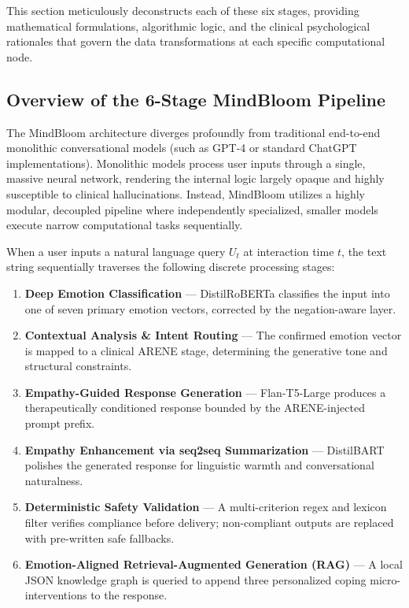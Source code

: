 \documentclass[12pt,twoside]{article}
\begin{document}
This section meticulously deconstructs each of these six stages, providing mathematical formulations, algorithmic logic, and the clinical psychological rationales that govern the data transformations at each specific computational node.

\subsection{Overview of the 6-Stage MindBloom Pipeline}

The MindBloom architecture diverges profoundly from traditional end-to-end monolithic conversational models (such as GPT-4 or standard ChatGPT implementations). Monolithic models process user inputs through a single, massive neural network, rendering the internal logic largely opaque and highly susceptible to clinical hallucinations. Instead, MindBloom utilizes a highly modular, decoupled pipeline where independently specialized, smaller models execute narrow computational tasks sequentially.

When a user inputs a natural language query $U_t$ at interaction time $t$, the text string sequentially traverses the following discrete processing stages:
\begin{enumerate}[leftmargin=2em]
  \item \textbf{Deep Emotion Classification} --- DistilRoBERTa classifies the input into one of seven primary emotion vectors, corrected by the negation-aware layer.
  \item \textbf{Contextual Analysis \& Intent Routing} --- The confirmed emotion vector is mapped to a clinical ARENE stage, determining the generative tone and structural constraints.
  \item \textbf{Empathy-Guided Response Generation} --- Flan-T5-Large produces a therapeutically conditioned response bounded by the ARENE-injected prompt prefix.
  \item \textbf{Empathy Enhancement via seq2seq Summarization} --- DistilBART polishes the generated response for linguistic warmth and conversational naturalness.
  \item \textbf{Deterministic Safety Validation} --- A multi-criterion regex and lexicon filter verifies compliance before delivery; non-compliant outputs are replaced with pre-written safe fallbacks.
  \item \textbf{Emotion-Aligned Retrieval-Augmented Generation (RAG)} --- A local JSON knowledge graph is queried to append three personalized coping micro-interventions to the response.
\end{enumerate}
\end{document}
